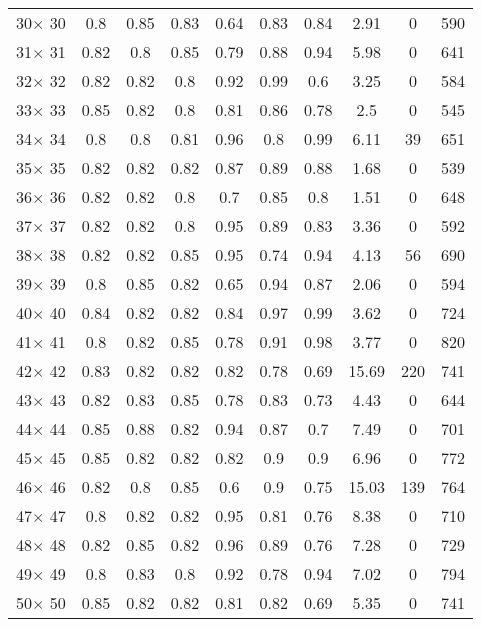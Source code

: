 \documentclass[main.tex]{subfiles}
\begin{document}
\begin{table}
\begin{tabular}{|c|c|c|c|c|c|c|c|c|c|}
30$\times$ 30 &0.8 &0.85 &0.83 &0.64 &0.83 &0.84 &2.91 &0 &590\\
31$\times$ 31 &0.82 &0.8 &0.85 &0.79 &0.88 &0.94 &5.98 &0 &641\\
32$\times$ 32 &0.82 &0.82 &0.8 &0.92 &0.99 &0.6 &3.25 &0 &584\\
33$\times$ 33 &0.85 &0.82 &0.8 &0.81 &0.86 &0.78 &2.5 &0 &545\\
34$\times$ 34 &0.8 &0.8 &0.81 &0.96 &0.8 &0.99 &6.11 &39 &651\\
35$\times$ 35 &0.82 &0.82 &0.82 &0.87 &0.89 &0.88 &1.68 &0 &539\\
36$\times$ 36 &0.82 &0.82 &0.8 &0.7 &0.85 &0.8 &1.51 &0 &648\\
37$\times$ 37 &0.82 &0.82 &0.8 &0.95 &0.89 &0.83 &3.36 &0 &592\\
38$\times$ 38 &0.82 &0.82 &0.85 &0.95 &0.74 &0.94 &4.13 &56 &690\\
39$\times$ 39 &0.8 &0.85 &0.82 &0.65 &0.94 &0.87 &2.06 &0 &594\\
40$\times$ 40 &0.84 &0.82 &0.82 &0.84 &0.97 &0.99 &3.62 &0 &724\\
41$\times$ 41 &0.8 &0.82 &0.85 &0.78 &0.91 &0.98 &3.77 &0 &820\\
42$\times$ 42 &0.83 &0.82 &0.82 &0.82 &0.78 &0.69 &15.69 &220 &741\\
43$\times$ 43 &0.82 &0.83 &0.85 &0.78 &0.83 &0.73 &4.43 &0 &644\\
44$\times$ 44 &0.85 &0.88 &0.82 &0.94 &0.87 &0.7 &7.49 &0 &701\\
45$\times$ 45 &0.85 &0.82 &0.82 &0.82 &0.9 &0.9 &6.96 &0 &772\\
46$\times$ 46 &0.82 &0.8 &0.85 &0.6 &0.9 &0.75 &15.03 &139 &764\\
47$\times$ 47 &0.8 &0.82 &0.82 &0.95 &0.81 &0.76 &8.38 &0 &710\\
48$\times$ 48 &0.82 &0.85 &0.82 &0.96 &0.89 &0.76 &7.28 &0 &729\\
49$\times$ 49 &0.8 &0.83 &0.8 &0.92 &0.78 &0.94 &7.02 &0 &794\\
50$\times$ 50 &0.85 &0.82 &0.82 &0.81 &0.82 &0.69 &5.35 &0 &741\\
    \hline
    \end{tabular}
\end{table}
\end{document}
